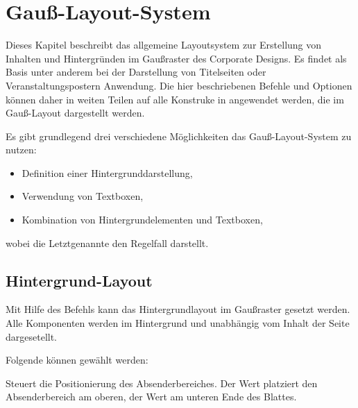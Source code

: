\chapter{Gauß-Layout-System}\label{chap:gausspage}

Dieses Kapitel beschreibt das allgemeine Layoutsystem zur Erstellung von
Inhalten und Hintergründen im Gaußraster des Corporate Designs.
Es findet als Basis unter anderem bei der Darstellung von Titelseiten oder
Veranstaltungspostern Anwendung. Die hier beschriebenen Befehle und Optionen
können daher in weiten Teilen auf alle Konstruke in \tubslatex angewendet
werden, die im Gauß-Layout dargestellt werden.

Es gibt grundlegend drei verschiedene Möglichkeiten das Gauß-Layout-System
zu nutzen:
\begin{itemize}
  \item Definition einer Hintergrunddarstellung,
  \item Verwendung von Textboxen,
  \item Kombination von Hintergrundelementen und Textboxen,
\end{itemize}
wobei die Letztgenannte den Regelfall darstellt.

\section{Hintergrund-Layout}

\begin{Declaration}
\end{Declaration}

Mit Hilfe des Befehls  kann das Hintergrundlayout im Gaußraster gesetzt werden.
Alle Komponenten werden im Hintergrund und unabhängig vom Inhalt der Seite
dargesetellt.

Folgende  können gewählt werden:

\begin{Declaration}
\end{Declaration}

Steuert die Positionierung des Absenderbereiches.
Der Wert  platziert den Absenderbereich am oberen,
der Wert  am unteren Ende des Blattes.

\begin{Declaration}
\end{Declaration}

